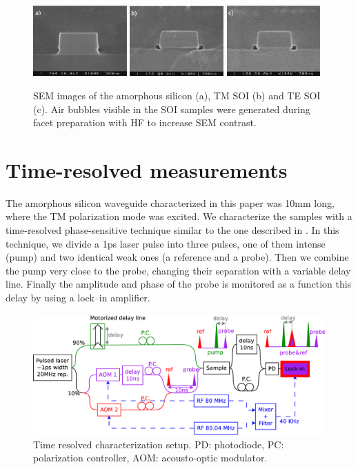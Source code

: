 \documentclass[10pt,letterpaper]{article}
\begin{document}
\begin{figure}[htb]
    \centering
    \includegraphics[width=0.32\textwidth]{p13_4}
    \includegraphics[width=0.32\textwidth]{semTM_4}
    \includegraphics[width=0.32\textwidth]{semTE_2}
    \caption{SEM images of the amorphous silicon (a), TM SOI (b) and TE SOI (c). Air bubbles visible in the SOI samples were generated during facet preparation with HF to increase SEM contrast.}
    \label{fig:sem}
\end{figure}


\section{Time-resolved measurements}
The amorphous silicon waveguide characterized in this paper was 10mm long, where the TM polarization mode was excited. We characterize the samples with a time-resolved phase-sensitive technique similar to the one described in \cite{Vallaitis2008}. In this technique, we divide a 1ps laser pulse into three pulses, one of them intense (pump) and two identical weak ones (a reference and a probe). Then we combine the pump very close to the probe, changing their separation with a variable delay line. Finally the amplitude and phase of the probe is monitored as a function this delay by using a lock--in amplifier.

\begin{figure}[htb]
    \centering
    \includegraphics[width=1.0\textwidth]{timeResolved9}
    \caption{Time resolved characterization setup. PD: photodiode, PC: polarization controller, AOM: acousto-optic modulator.}
    \label{fig:setupTimeRes}
\end{figure}
\end{document}

